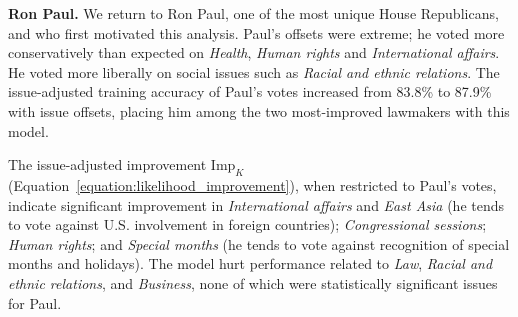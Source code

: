 





\textbf{Ron Paul.}
We return to Ron Paul, one of the most unique House Republicans, and
who first motivated this analysis.  Paul's offsets were extreme; he
voted more conservatively than expected on \emph{Health},
\emph{Human rights} and \emph{International affairs}.  He voted more
liberally on social issues such as \emph{Racial and ethnic relations}.
The issue-adjusted training accuracy of Paul's votes increased from
83.8\% to 87.9\% with issue offsets, placing him among the two
most-improved lawmakers with this model.

The issue-adjusted improvement $\mbox{Imp}_K$
(Equation~\ref{equation:likelihood_improvement}), when restricted to
Paul's votes, indicate significant improvement in \emph{International
  affairs} and \emph{East Asia} (he tends to vote against
U.S. involvement in foreign countries); \emph{Congressional sessions};
\emph{Human rights}; and \emph{Special months} (he tends to vote
against recognition of special months and holidays).  The model hurt
performance related to \emph{Law}, \emph{Racial and ethnic relations},
and \emph{Business}, none of which were statistically significant
issues for Paul.

